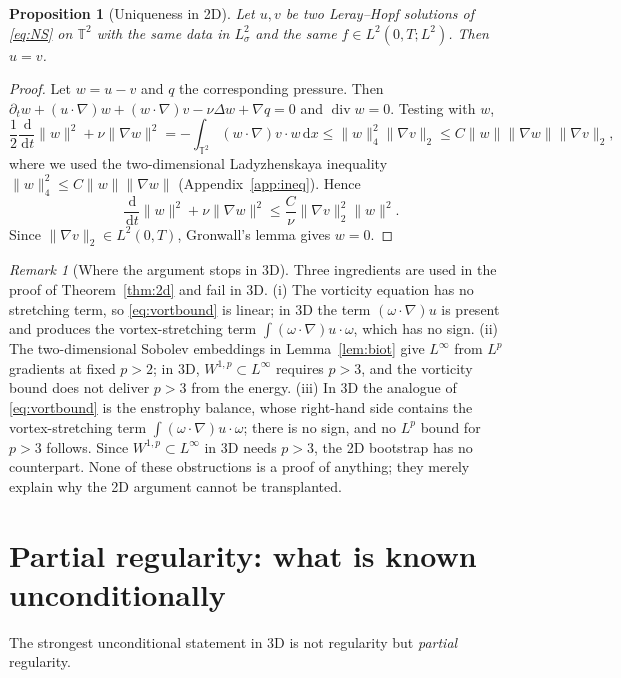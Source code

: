 \documentclass[11pt]{article}
\newtheorem{proposition}[theorem]{Proposition}
\theoremstyle{remark}
\newtheorem{remark}[theorem]{Remark}
\newcommand{\T}{\mathbb{T}}
\newcommand{\dd}{\,\mathrm{d}}
\newcommand{\norm}[1]{\lVert #1\rVert}
\newcommand{\Div}{\operatorname{div}}
\begin{document}
\begin{proposition}[Uniqueness in 2D]\label{prop:uniqueness2d}
Let $u,v$ be two Leray--Hopf solutions of \eqref{eq:NS} on $\T^2$ with the same data in
$L^2_\sigma$ and the same $f\in L^2(0,T;L^2)$. Then $u=v$.
\end{proposition}

\begin{proof}
Let $w=u-v$ and $q$ the corresponding pressure. Then
$\partial_tw+(u\cdot\nabla)w+(w\cdot\nabla)v-\nu\Delta w+\nabla q=0$ and $\Div w=0$. Testing
with $w$,
\[
\frac12\frac{\dd}{\dd t}\norm{w}^2+\nu\norm{\nabla w}^2
=-\int_{\T^2}(w\cdot\nabla)v\cdot w\dd x
\le\norm{w}_{4}^2\norm{\nabla v}_2
\le C\norm{w}\norm{\nabla w}\norm{\nabla v}_2,
\]
where we used the two-dimensional Ladyzhenskaya inequality
$\norm{w}_4^2\le C\norm{w}\norm{\nabla w}$ (Appendix~\ref{app:ineq}). Hence
\[
\frac{\dd}{\dd t}\norm{w}^2+\nu\norm{\nabla w}^2\le\frac{C}{\nu}\norm{\nabla v}_2^2\norm{w}^2 .
\]
Since $\norm{\nabla v}_2\in L^2(0,T)$, Gronwall's lemma gives $w=0$.
\end{proof}

\begin{remark}[Where the argument stops in 3D]\label{rem:2d3d}
Three ingredients are used in the proof of Theorem~\ref{thm:2d} and fail in 3D.
(i) The vorticity equation has no stretching term, so \eqref{eq:vortbound} is linear; in 3D
the term $(\omega\cdot\nabla)u$ is present and produces the vortex-stretching term
$\int(\omega\cdot\nabla)u\cdot\omega$, which has no sign.
(ii) The two-dimensional Sobolev embeddings in Lemma~\ref{lem:biot} give $L^\infty$ from $L^p$
gradients at fixed $p>2$; in 3D, $W^{1,p}\subset L^\infty$ requires $p>3$, and the vorticity
bound does not deliver $p>3$ from the energy.
(iii) In 3D the analogue of \eqref{eq:vortbound} is the enstrophy balance, whose right-hand
side contains the vortex-stretching term $\int(\omega\cdot\nabla)u\cdot\omega$; there is no
sign, and no $L^p$ bound for $p>3$ follows. Since $W^{1,p}\subset L^\infty$ in 3D needs
$p>3$, the 2D bootstrap has no counterpart.
None of these obstructions is a proof of anything; they merely explain why the 2D argument
cannot be transplanted.
\end{remark}

\section{Partial regularity: what is known unconditionally}\label{sec:partial}

The strongest unconditional statement in 3D is not regularity but \emph{partial} regularity.
\end{document}
